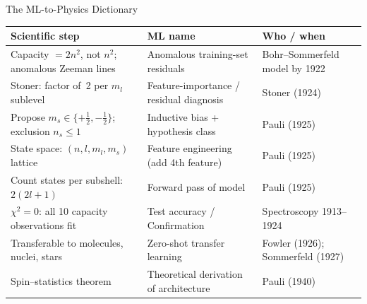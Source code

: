 \documentclass[aspectratio=169,12pt]{beamer}
\begin{document}
\begin{frame}[shrink=30]{The ML-to-Physics Dictionary}

\begin{center}
\footnotesize
\renewcommand{\arraystretch}{1.10}
\begin{tabular}{p{5.5cm}p{4.8cm}p{3.5cm}}
\toprule
\textbf{Scientific step} & \textbf{ML name} & \textbf{Who / when} \\
\midrule
Capacity $= 2n^2$, not $n^2$; anomalous Zeeman lines &
  Anomalous training-set residuals & Bohr--Sommerfeld model by 1922 \\
Stoner: factor of~2 per $m_l$ sublevel &
  Feature-importance / residual diagnosis & Stoner (1924) \\
Propose $m_s\in\{+\tfrac{1}{2},-\tfrac{1}{2}\}$;
  exclusion $n_s\leq 1$ &
  Inductive bias + hypothesis class & Pauli (1925) \\
State space: $(n,l,m_l,m_s)$ lattice &
  Feature engineering (add 4th feature) & Pauli (1925) \\
Count states per subshell: $2(2l+1)$ &
  Forward pass of model & Pauli (1925) \\
$\chi^2 = 0$: all 10 capacity observations fit &
  Test accuracy / Confirmation & Spectroscopy 1913--1924 \\
Transferable to molecules, nuclei, stars &
  Zero-shot transfer learning & Fowler (1926); Sommerfeld (1927) \\
Spin--statistics theorem &
  Theoretical derivation of architecture & Pauli (1940) \\
\bottomrule
\end{tabular}
\end{center}

\end{frame}
\end{document}
